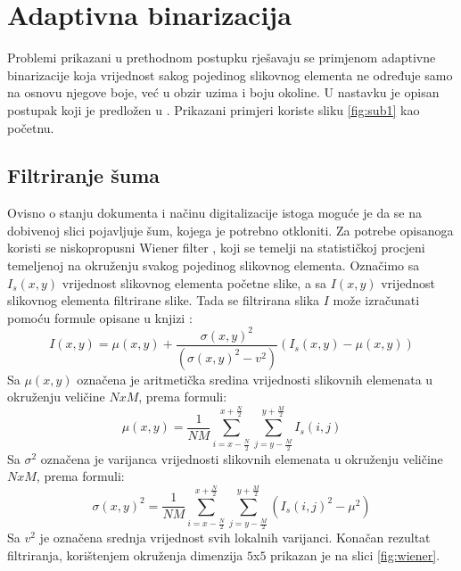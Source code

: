 \documentclass[times, utf8, zavrsni, numeric]{fer}
\begin{document}
\section{Adaptivna binarizacija}
Problemi prikazani u prethodnom postupku rješavaju se primjenom adaptivne binarizacije koja vrijednost sakog pojedinog slikovnog elementa ne određuje samo na osnovu njegove boje, već u obzir uzima i boju okoline.
U nastavku je opisan postupak koji je predložen u \cite{AdaptiveBinarization}.
Prikazani primjeri koriste sliku \ref{fig:sub1} kao početnu.

\subsection{Filtriranje šuma}
Ovisno o stanju dokumenta i načinu digitalizacije istoga moguće je da se na dobivenoj slici pojavljuje šum, kojega je potrebno otkloniti.
Za potrebe opisanoga koristi se niskopropusni Wiener filter \cite{book:Two-Dimensional-Signal-Image-Processing}, koji se temelji na statističkoj procjeni temeljenoj na okruženju svakog pojedinog slikovnog elementa. \cite{AdaptiveBinarization}
Označimo sa $I_s(x, y)$ vrijednost slikovnog elementa početne slike, a sa $I(x, y)$ vrijednost slikovnog elementa filtrirane slike.
Tada se filtrirana slika $I$ može izračunati pomoću formule opisane u knjizi \cite{book:Two-Dimensional-Signal-Image-Processing}:
\[I(x, y) = \mu(x, y) + \frac{\sigma(x, y)^2}{(\sigma(x, y)^2 - v^2)}(I_s(x, y) - \mu(x, y))\]
Sa $\mu(x, y)$ označena je aritmetička sredina vrijednosti slikovnih elemenata u okruženju veličine $NxM$, prema formuli:
\[\mu(x, y) = \frac{1}{NM} 
    \displaystyle \sum_{i = x-\frac{N}{2}}^{x+\frac{N}{2}}
    \displaystyle \sum_{j = y-\frac{M}{2}}^{y+\frac{M}{2}}
I_s(i, j)\]
Sa $\sigma^2$ označena je varijanca vrijednosti slikovnih elemenata u okruženju veličine $NxM$, prema formuli:
\[\sigma(x, y)^2 = \frac{1}{NM} 
    \displaystyle \sum_{i = x-\frac{N}{2}}^{x+\frac{N}{2}}
    \displaystyle \sum_{j = y-\frac{M}{2}}^{y+\frac{M}{2}}
(I_s(i, j)^2 - \mu^2)\]
Sa $v^2$ je označena srednja vrijednost svih lokalnih varijanci.
Konačan rezultat filtriranja, korištenjem okruženja dimenzija $5$x$5$ prikazan je na slici \ref{fig:wiener}.
\end{document}
